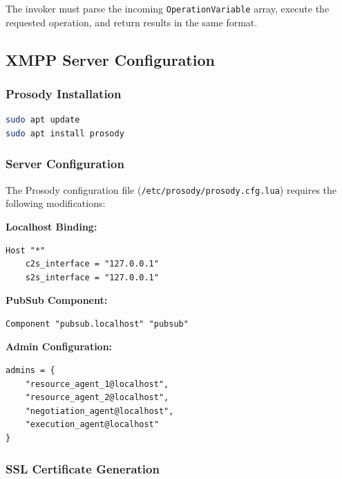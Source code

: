 The invoker must parse the incoming \texttt{OperationVariable} array, execute the requested operation, and return results in the same format.

\subsection{XMPP Server Configuration}
\label{app:xmpp_config}

\subsubsection{Prosody Installation}

\begin{lstlisting}[language=bash, caption={Prosody Installation}, label={lst:prosody_install}]
sudo apt update 
sudo apt install prosody
\end{lstlisting}

\subsubsection{Server Configuration}

The Prosody configuration file (\texttt{/etc/prosody/prosody.cfg.lua}) requires the following modifications:

\textbf{Localhost Binding:}
\begin{lstlisting}[language={[5.0]Lua}, caption={Prosody Host Configuration}, label={lst:prosody_host}]
Host "*"
    c2s_interface = "127.0.0.1"
    s2s_interface = "127.0.0.1"
\end{lstlisting}

\textbf{PubSub Component:}
\begin{lstlisting}[language={[5.0]Lua}, caption={PubSub Component Configuration}, label={lst:pubsub_config}]
Component "pubsub.localhost" "pubsub"
\end{lstlisting}

\textbf{Admin Configuration:}
\begin{lstlisting}[language={[5.0]Lua}, caption={Admin Configuration}, label={lst:admin_config}]
admins = {
    "resource_agent_1@localhost",
    "resource_agent_2@localhost",
    "negotiation_agent@localhost",
    "execution_agent@localhost"
}
\end{lstlisting}

\subsubsection{SSL Certificate Generation}

